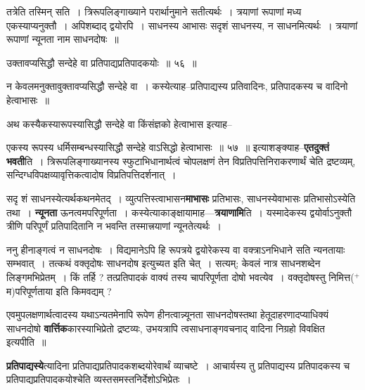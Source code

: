 \documentclass[article,12pt,a4paper]{memoir}
\newcommand{\add}[1]{($^{+}$#1)}
\begin{document}
	तत्रेति तस्मिन् सति । त्रिरूपलिङ्गाख्याने परार्थानुमाने सतीत्यर्थः । त्रयाणां रूपाणां मध्य एकस्याप्यनुक्तौ । अपिशब्दाद् द्वयोरपि । साधनस्य आभासः सदृशं साधनस्य, न साधनमित्यर्थः । त्रयाणां रूपाणां न्यूनता नाम साधनदोषः ॥  
	  
	उक्तावप्यसिद्धौ सन्देहे वा प्रतिपाद्यप्रतिपादकयोः ॥ ५६ ॥ 
	  
	न केवलमनुक्तावुक्तावप्यसिद्धौ सन्देहे वा । कस्येत्याह--प्रतिपाद्यस्य प्रतिवादिनः, प्रतिपादकस्य च वादिनो हेत्वाभासः ॥  
	  
	अथ कस्यैकस्यारूपस्यासिद्धौ सन्देहे वा किंसंज्ञको हेत्वाभास इत्याह-- 
	  
	एकस्य रूपस्य धर्मिसम्बन्धस्यासिद्धौ सन्देहे वाऽसिद्धो हेत्वाभासः ॥ ५७ ॥ इत्याशङ्क्याह--\textbf{एतदुक्तं भवती}ति । त्रिरूपलिङ्गाख्यानस्य स्फुटाभिधानार्थत्वं चोपलक्षणं तेन विप्रतिपत्तिनिराकरणार्थं चेति द्रष्टव्यम्, सन्दिग्धविपक्षव्यावृत्तिकत्वादोष  विप्रतिपत्तिदर्शनात् ।
	\pend
      

	  \pstart सदृ\leavevmode{} शं साधनस्येत्यर्थकथनमेतद् । व्युत्पत्तिस्त्वाभासन\textbf{माभासः} प्रतिभासः, साधनस्येवाभासः प्रतिभासोऽस्येति तथा । \textbf{न्यूनता} ऊनत्वमपरिपूर्णता । कस्येत्याकाङ्क्षायामाह—\textbf{त्रयाणामि}ति । यस्मादेकस्य द्वयोर्वाऽनुक्तौ त्रीणि परिपूर्णं प्रतिपादितानि न भवन्ति तस्मात्त्रयाणां न्यूनतेत्यर्थः ।
	\pend
      

	  \pstart ननु हीनाङ्गत्वं न साधनदोषः । विद्यमानेऽपि हि रूपत्रये द्वयोरेकस्य वा वक्त्राऽनभिधाने सति न्यनतायाः सम्भवात् । तत्कथं वक्तृदोषः साधनदोष इत्युच्यत इति चेत् । सत्यम्; केवलं नात्र साधनशब्देन लिङ्गमभिप्रेतम् । किं तर्हि ? तत्प्रतिपादकं वाक्यं तस्य चापरिपूर्णता दोषो भवत्येव । वक्तृदोषस्तु निमित्त\add{म}परिपूर्णताया इति किमवद्यम् ?
	\pend
      

	  \pstart एवमुपलक्षणार्थत्वादस्य यथाऽन्यतमेनापि रूपेण हीनत्वान्न्यूनता साधनदोषस्तथा हेतूदाहरणादप्याधिक्यं साधनदोषो \textbf{वार्त्तिक}कारस्याभिप्रेतो द्रष्टव्यः, उभयत्रापि त्वसाधनाङ्गवचनाद् वादिना निग्रहो विवक्षित इत्यपीति ॥
	\pend
      

	  \pstart \textbf{प्रतिपाद्यस्ये}त्यादिना प्रतिपाद्यप्रतिपादकशब्दयोरेवार्थं व्याचष्टे । आचार्यस्य तु प्रतिपाद्यस्य प्रतिपादकस्य च प्रतिपाद्यप्रतिपादकयोश्चेति व्यस्तसमस्तनिर्देशोऽभिप्रेतः ।
	\pend
	  \bigskip
	  \begingroup
	
\end{document}
